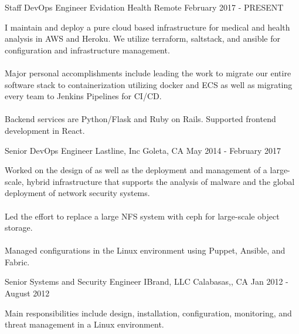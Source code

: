 
\begin{cventries}
  \cventry
    {Staff DevOps Engineer} %
    {Evidation Health} %
    {Remote} %
    {February 2017 - PRESENT} %
    {
      \begin{cvitems} %
          {I maintain and deploy a pure cloud based infrastructure for medical and health analysis in AWS and Heroku. We utilize terraform, saltstack, and ansible for configuration and infrastructure management. \\~\\ Major personal accomplishments include leading the work to migrate our entire software stack to containerization utilizing docker and ECS as well as migrating every team to Jenkins Pipelines for CI/CD. \\~\\ Backend services are Python/Flask and Ruby on Rails. Supported frontend development in React.}
      \end{cvitems}
    }

  \cventry
    {Senior DevOps Engineer} %
    {Lastline, Inc} %
    {Goleta, CA} %
    {May 2014 - February 2017} %
    {
      \begin{cvitems} %
        { Worked on the design of as well as the deployment and management of a large-scale, hybrid infrastructure that supports the analysis of malware and the global deployment of network security systems. \\~\\ Led the effort to replace a large NFS system with ceph for large-scale object storage. \\~\\ Managed configurations in the Linux environment using Puppet, Ansible, and Fabric. }
      \end{cvitems}
    }

  \cventry
    {Senior Systems and Security Engineer} %
    {IBrand, LLC} %
    {Calabasas,, CA} %
    {Jan 2012 - August 2012} %
    {
      \begin{cvitems} %
        { Main responsibilities include design, installation, configuration, monitoring, and threat management in a Linux environment. }
      \end{cvitems}
    }


\end{cventries}
